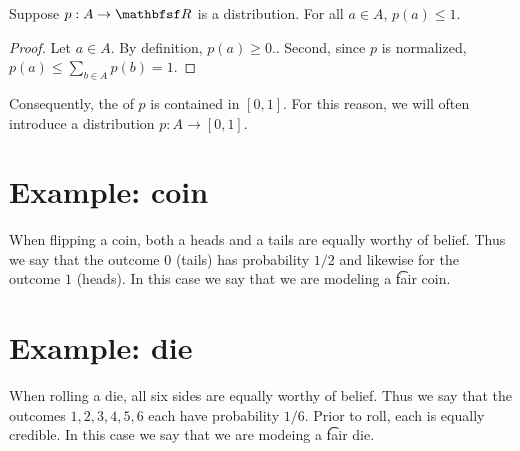 \begin{proposition}
Suppose $p: A \to \R $ is a distribution.
For all $a \in A$, $p(a) \leq 1$.
\begin{proof}Let $a \in A$.
By definition, $p(a) \geq 0$..
Second, since $p$ is normalized, $p(a) \leq \sum_{b \in A} p(b) = 1$.\end{proof}\end{proposition}
Consequently, the of $p$ is contained in $[0,1]$.
For this reason, we will often introduce a distribution $p: A \to [0,1]$.

\section*{Example: coin}

When flipping a coin, both a heads and a tails are equally worthy of belief.
Thus we say that the outcome $0$ (tails) has probability $1/2 $ and likewise for the outcome $1$ (heads).
In this case we say that we are modeling a \t{fair coin}.

\section*{Example: die}

When rolling a die, all six sides are equally worthy of belief.
Thus we say that the outcomes $1, 2, 3, 4, 5, 6$ each have probability $1/6 $.
Prior to roll, each is equally credible.
In this case we say that we are modeing a \t{fair die}.
